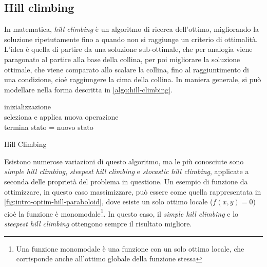 \subsection{Hill climbing}
\label{chap:intro-optim-hill}
In matematica, \textit{hill climbing} è un algoritmo di ricerca dell'ottimo, migliorando la soluzione ripetutamente fino a quando non si raggiunge un criterio di ottimalità. L'idea è quella di partire da una soluzione sub-ottimale, che per analogia viene paragonato al partire alla base della collina, per poi migliorare la soluzione ottimale, che viene comparato allo scalare la collina, fino al raggiuntimento di una condizione, cioè raggiungere la cima della collina. In maniera generale, si può modellare nella forma descritta in \autoref{algo:hill-climbing}.
\begin{algorithm}[H]
    \SetAlgoLined
    inizializzazione \\
     {
        seleziona e applica nuova operazione \\
         {
            termina
        }
         {
            stato = nuovo stato
        }
    }
    \caption{Hill Climbing}
    \label{algo:hill-climbing}
\end{algorithm}
\vspace{4ex}
Esistono numerose variazioni di questo algoritmo, ma le più conosciute sono \textit{simple hill climbing}, \textit{steepest hill climbing} e \textit{stocastic hill climbing}, applicate a seconda delle proprietà del problema in questione. Un esempio di funzione da ottimizzare, in questo caso massimizzare, può essere come quella rappresentata in \autoref{fig:intro-optim-hill-paraboloid}, dove esiste un solo ottimo locale ($f(x, y) = 0$) cioè la funzione è monomodale\footnote{Una funzione monomodale è una funzione con un solo ottimo locale, che corrisponde anche all'ottimo globale della funzione stessa}. In questo caso, il \textit{simple hill climbing} e lo \textit{steepest hill climbing} ottengono sempre il risultato migliore.

